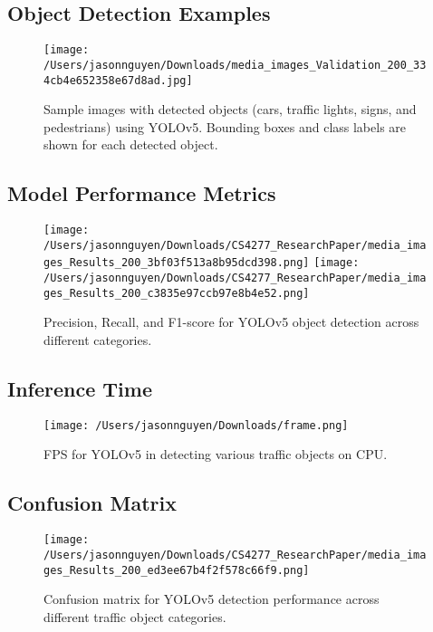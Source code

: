 \documentclass[11pt]{article}
\begin{document}
\subsection{Object Detection Examples}
\begin{figure}[H]
    \centering
    \texttt{[image: /Users/jasonnguyen/Downloads/media\_images\_Validation\_200\_334cb4e652358e67d8ad.jpg]}
    \caption{Sample images with detected objects (cars, traffic lights, signs, and pedestrians) using YOLOv5. Bounding boxes and class labels are shown for each detected object.}
    \label{fig:detection_example_1}
\end{figure}
\subsection{Model Performance Metrics}

\begin{figure}[H]
    \centering
        \texttt{[image: /Users/jasonnguyen/Downloads/CS4277\_ResearchPaper/media\_images\_Results\_200\_3bf03f513a8b95dcd398.png]}
    	\texttt{[image: /Users/jasonnguyen/Downloads/CS4277\_ResearchPaper/media\_images\_Results\_200\_c3835e97ccb97e8b4e52.png]}

        \caption{Precision, Recall, and F1-score for YOLOv5 object detection across different categories.}
    \label{fig:metrics}
\end{figure}

\subsection{Inference Time}
\begin{figure}[H]
    \centering
    \texttt{[image: /Users/jasonnguyen/Downloads/frame.png]}

    \caption{FPS for YOLOv5 in detecting various traffic objects on CPU.}
    \label{fig:fps}
\end{figure}

\subsection{Confusion Matrix}
\begin{figure}[H]
    \centering
     \texttt{[image: /Users/jasonnguyen/Downloads/CS4277\_ResearchPaper/media\_images\_Results\_200\_ed3ee67b4f2f578c66f9.png]}
    \caption{Confusion matrix for YOLOv5 detection performance across different traffic object categories.}
    \label{fig:confusion_matrix}
\end{figure}
\end{document}
